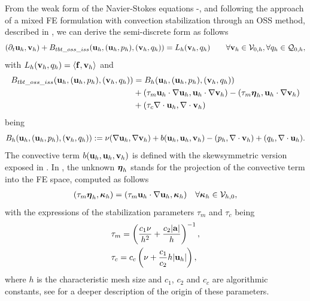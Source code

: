 From the weak form of the Navier-Stokes equations -, and following the approach of a mixed FE formulation with convection stabilization through an OSS method, described in , we can derive the semi-discrete form as follows
\begin{equation}
\label{eq-C8_NS_discrete}
(\partial_t{\bf u}_h,{\bf v}_h)+B_{tbt\_oss\_iss}({\bf u}_h,({\bf u}_h,p_h),({\bf v}_h,q_h)) =L_h({\bf v}_h,q_h)\quad\quad\forall{\bf v}_h\in\mathcal{V}_{0,h},\forall q_h\in\mathcal{Q}_{0,h},
\end{equation}
with $L_h({\bf v}_h,q_h)=\left<{\bf f},{\bf v}_h\right>$  and
\begin{align}
\label{eq-C8_biliniar_oss_tbt_iss}
B_{tbt\_oss\_iss}({\bf u}_h,({\bf u}_h,p_h),({\bf v}_h,q_h))&=B_h({\bf u}_h,({\bf u}_h,p_h),({\bf v}_h,q_h))\\\nonumber
&+(\tau_m{\bf u}_h\cdot\nabla{\bf u}_h,{\bf u}_h\cdot\nabla{\bf v}_h)-(\tau_m\boldsymbol{\eta}_h,{\bf u}_h\cdot\nabla{\bf v}_h)\\\nonumber
&+(\tau_c\nabla\cdot{\bf u}_h,\nabla\cdot{\bf v}_h)
\end{align}
being
\begin{equation}
\label{eq-C8_bilinear_discrete}
B_h({\bf u}_h,({\bf u}_h,p_h),({\bf v}_h,q_h)):=\nu(\nabla{\bf u}_h,\nabla{\bf v}_h)+b({\bf u}_h,{\bf u}_h,{\bf v}_h)-(p_h,\nabla\cdot{\bf v}_h)+(q_h,\nabla\cdot{\bf u}_h).
\end{equation}
The convective term $ b({\bf u}_h,{\bf u}_h,{\bf v}_h) $ is defined with the skewsymmetric version exposed in . In , the unknown $ \boldsymbol{\eta}_h $ stands for the projection of the convective term into the FE space, computed as follows
\begin{align}
\label{eq-C8_NSprojectiondef1}
&(\tau_m\boldsymbol{\eta}_h,\boldsymbol{\kappa}_h) = (\tau_m {\bf u}_h\cdot\nabla{\bf u}_h,\boldsymbol{\kappa}_h)&\forall \boldsymbol{\kappa}_h\in\mathcal{V}_{h,0},
\end{align}
with the expressions of the stabilization parameters $\tau_m$ and $\tau_c$ being
\begin{align}
\label{eq-C8_tau_m}
&\tau_m=\left(\frac{c_1\nu}{h^2}+\frac{c_2|{\bf a}|}{h}\right)^{-1},\\
\label{eq-C8_tau_c_alt}
&\tau_c=c_c\left(\nu+\frac{c_1}{c_2}h|{\bf u}_h|\right),
\end{align}
where $h$ is the characteristic mesh size and $c_1$, $c_2$ and $ c_c $ are algorithmic constants, see  for a deeper description of the origin of these parameters.

